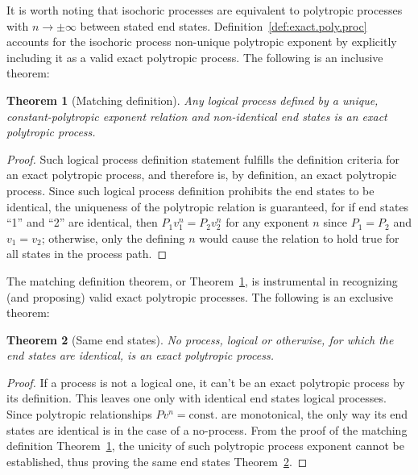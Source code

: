 \documentclass[10pt,a4paper]{article}
\newtheorem{theorem}{Theorem}
\begin{document}
\begin{multicols*}{2}
    It is worth noting that isochoric processes are equivalent to polytropic processes  with  $n
    \to \pm\infty$ between stated end states. Definition~\ref{def:exact.poly.proc} accounts  for
    the isochoric process non-unique polytropic exponent by explicitly including it as  a  valid
    exact polytropic process. The following is an inclusive theorem:

    \begin{theorem}[Matching definition]\label{theo:matching.def}
        Any logical process defined by  a  unique,  constant-polytropic  exponent  relation  and
        non-identical end states is an exact polytropic process.
    \end{theorem}

    \begin{proof}
        Such logical process definition statement fulfills the definition criteria for an  exact
        polytropic process, and therefore is, by definition, an exact polytropic process.  Since
        such logical process definition prohibits the end states to be identical, the uniqueness
        of the polytropic relation is  guaranteed,  for  if  end  states  ``1''  and  ``2''  are
        identical, then $P_1v_1^n = P_2v_2^n$ for any exponent $n$ since $P_1 = P_2$ and $v_1  =
        v_2$; otherwise, only the defining $n$ would cause the relation to  hold  true  for  all
        states in the process path.
    \end{proof}

    The matching definition theorem, or Theorem~\ref{theo:matching.def}, is instrumental in
    recognizing (and proposing) valid exact polytropic processes. The following is an exclusive
    theorem:

    \begin{theorem}[Same end states]\label{theo:same.end.states}
        No process, logical or otherwise, for which the end states are identical, is an exact
        polytropic process.
    \end{theorem}

    \begin{proof}
        If a process is not a logical one, it can't  be  an  exact  polytropic  process  by  its
        definition. This leaves one only with identical  end  states  logical  processes.  Since
        polytropic relationships $Pv^n = \mbox{const.}$ are monotonical, the only  way  its  end
        states are identical is in the case of a no-process. From  the  proof  of  the  matching
        definition Theorem~\ref{theo:matching.def},  the  unicity  of  such  polytropic  process
        exponent   cannot   be   established,    thus    proving    the    same    end    states
        Theorem~\ref{theo:same.end.states}.
    \end{proof}


\end{multicols*}
\end{document}
